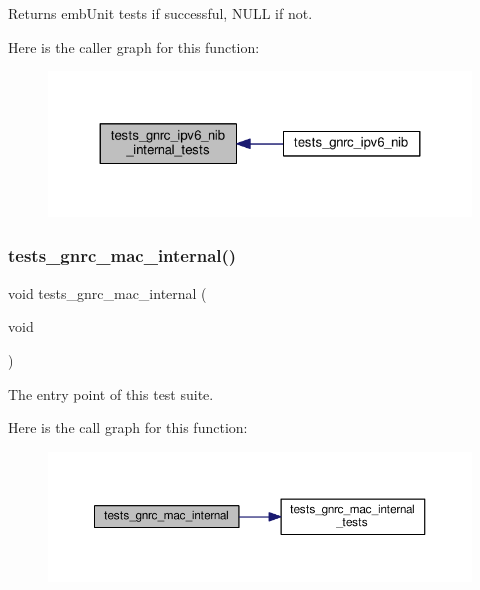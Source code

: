 \begin{DoxyReturn}{Returns}
emb\+Unit tests if successful, N\+U\+LL if not. 
\end{DoxyReturn}
Here is the caller graph for this function\+:
\nopagebreak
\begin{figure}[H]
\begin{center}
\leavevmode
\includegraphics[width=324pt]{group__unittests_gabe2d41bf28233304c4a66a8ac44c9404_icgraph}
\end{center}
\end{figure}
\mbox{\label{group__unittests_ga4520245974f5c91b71a68215b4910126}} 
\subsubsection{\texorpdfstring{tests\+\_\+gnrc\+\_\+mac\+\_\+internal()}{tests\_gnrc\_mac\_internal()}}
{\footnotesize\ttfamily void tests\+\_\+gnrc\+\_\+mac\+\_\+internal (\begin{DoxyParamCaption}\item[{void}]{ }\end{DoxyParamCaption})}



The entry point of this test suite. 

Here is the call graph for this function\+:
\nopagebreak
\begin{figure}[H]
\begin{center}
\leavevmode
\includegraphics[width=350pt]{group__unittests_ga4520245974f5c91b71a68215b4910126_cgraph}
\end{center}
\end{figure}
\mbox{\label{group__unittests_gaa2175e6139cd4093cd5668926a58e869}} 
